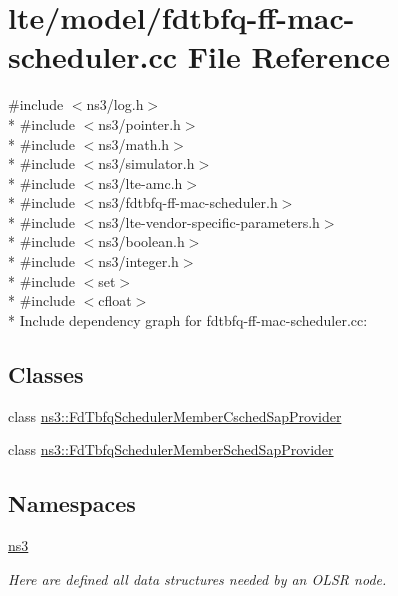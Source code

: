 \hypertarget{fdtbfq-ff-mac-scheduler_8cc}{}\section{lte/model/fdtbfq-\/ff-\/mac-\/scheduler.cc File Reference}
\label{fdtbfq-ff-mac-scheduler_8cc}
{\ttfamily \#include $<$ns3/log.\+h$>$}\\*
{\ttfamily \#include $<$ns3/pointer.\+h$>$}\\*
{\ttfamily \#include $<$ns3/math.\+h$>$}\\*
{\ttfamily \#include $<$ns3/simulator.\+h$>$}\\*
{\ttfamily \#include $<$ns3/lte-\/amc.\+h$>$}\\*
{\ttfamily \#include $<$ns3/fdtbfq-\/ff-\/mac-\/scheduler.\+h$>$}\\*
{\ttfamily \#include $<$ns3/lte-\/vendor-\/specific-\/parameters.\+h$>$}\\*
{\ttfamily \#include $<$ns3/boolean.\+h$>$}\\*
{\ttfamily \#include $<$ns3/integer.\+h$>$}\\*
{\ttfamily \#include $<$set$>$}\\*
{\ttfamily \#include $<$cfloat$>$}\\*
Include dependency graph for fdtbfq-\/ff-\/mac-\/scheduler.cc\+:
\subsection*{Classes}
\begin{DoxyCompactItemize}
\item 
class \hyperlink{classns3_1_1FdTbfqSchedulerMemberCschedSapProvider}{ns3\+::\+Fd\+Tbfq\+Scheduler\+Member\+Csched\+Sap\+Provider}
\item 
class \hyperlink{classns3_1_1FdTbfqSchedulerMemberSchedSapProvider}{ns3\+::\+Fd\+Tbfq\+Scheduler\+Member\+Sched\+Sap\+Provider}
\end{DoxyCompactItemize}
\subsection*{Namespaces}
\begin{DoxyCompactItemize}
\item 
 \hyperlink{namespacens3}{ns3}
\begin{DoxyCompactList}\small\item\em Here are defined all data structures needed by an O\+L\+SR node. \end{DoxyCompactList}\end{DoxyCompactItemize}
